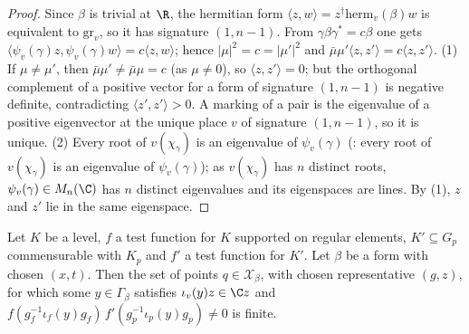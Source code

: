 \begin{proof}
Since $\beta$ is trivial at $\R$, the hermitian form $\langle z,w\rangle=z^\dagger\mathrm{herm}_v(\beta)w$ is equivalent to $\mathrm{gr}_v$, so it has signature
$(1,n-1)$. From $\gamma\beta\gamma^*=c\beta$ one gets $\langle\psi_v(\gamma)z,\psi_v(\gamma)w\rangle=c\langle z,w\rangle$; hence $|\mu|^2=c=|\mu'|^2$ and
$\bar\mu\mu'\langle z,z'\rangle=c\langle z,z'\rangle$. (1) If $\mu\neq\mu'$, then $\bar\mu\mu'\neq\bar\mu\mu=c$ (as $\mu\neq0$), so $\langle z,z'\rangle=0$; but the
orthogonal complement of a positive vector for a form of signature $(1,n-1)$ is negative definite, contradicting $\langle z',z'\rangle>0$. A marking of
a pair is the eigenvalue of a positive eigenvector at the unique place $v$ of signature $(1,n-1)$, so it is unique. (2) Every root of $v(\chi_\gamma)$ is an
eigenvalue of $\psi_v(\gamma)$ (: every root of $v(\chi_\gamma)$ is an eigenvalue of $\psi_v(\gamma)$);
as $v(\chi_\gamma)$ has $n$ distinct roots, $\psi_v(\gamma)\in M_n(\C)$ has $n$ distinct eigenvalues and its eigenspaces are lines. By (1), $z$ and $z'$ lie
in the same eigenspace.
\end{proof}

\begin{lemma}\label{pf:ks1:lem-finpts}
Let $K$ be a level, $f$ a test function for $K$ supported on regular elements, $K'\subseteq G_p$ commensurable with $K_p$ and $f'$ a test function
for $K'$. Let $\beta$ be a form with chosen $(x,t)$. Then the set of points $q\in\mathcal X_\beta$, with chosen representative $(g,z)$, for which some
$y\in\Gamma_\beta$ satisfies $\iota_v(y)z\in\C z$ and $f(g_f^{-1}\iota_f(y)g_f)\,f'(g_p^{-1}\iota_p(y)g_p)\neq0$ is finite.
\end{lemma}

